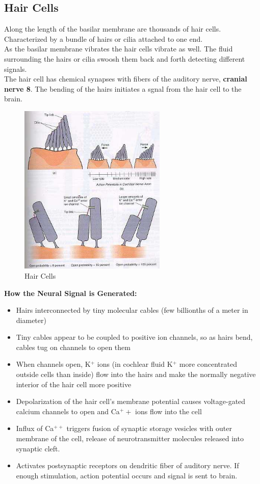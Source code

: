 \documentclass{article}
\begin{document}
\subsection{Hair Cells}
Along the length of the basilar membrane are thousands of hair cells. Characterized by a bundle of hairs or cilia attached to one end. \\

\noindent As the basilar membrane vibrates the hair cells vibrate as well. The fluid surrounding the hairs or cilia swoosh them back and forth detecting different signals. \\
The hair cell has chemical synapses with fibers of the auditory nerve, \textbf{cranial nerve 8}. The bending of the hairs initiates a sgnal from the hair cell to the brain. \\

\begin{figure}[htp]
\centering
\includegraphics[width=7cm]{images/haircells.jpg}
\caption{Hair Cells}
\label{fig: Hair cells}
\end{figure}

\textbf{How the Neural Signal is Generated:}
\begin{itemize}
    \item Hairs interconnected by tiny molecular cables (few billionths of a meter in diameter)
    \item Tiny cables appear to be coupled to positive ion channels, so as hairs bend, cables tug on channels to open them
    \item When channels open, K$^+$ ions (in cochlear fluid K$^+$ more concentrated outside cells than inside) flow into the hairs and make the normally negative interior of the hair cell more positive
    \item Depolarization of the hair cell's membrane potential causes voltage-gated calcium channels to open and Ca$^++$ ions flow into the cell
    \item Influx of Ca$^{++}$ triggers fusion of synaptic storage vesicles with outer membrane of the cell, release of neurotransmitter molecules released into synaptic cleft. 
    \item Activates postsynaptic receptors on dendritic fiber of auditory nerve. If enough stimulation, action potential occurs and signal is sent to brain. 
\end{itemize}
\end{document}
